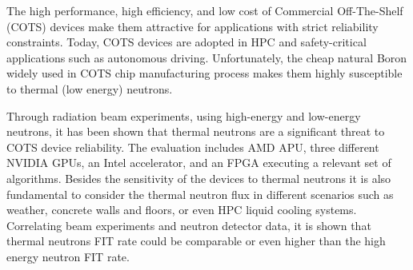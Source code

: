 The high performance, high efficiency, and low cost of Commercial Off-The-Shelf (COTS) devices make them attractive for applications with strict reliability constraints. Today, COTS devices are adopted in HPC and safety-critical applications such as autonomous driving. Unfortunately, the cheap natural Boron widely used in COTS chip manufacturing process makes them highly susceptible to thermal (low energy) neutrons.
 
Through radiation beam experiments, using high-energy and low-energy neutrons, it has been shown that thermal neutrons are a significant threat to COTS device reliability. The evaluation includes AMD APU, three different NVIDIA GPUs, an Intel accelerator, and an FPGA executing a relevant set of algorithms. Besides the sensitivity of the devices to thermal neutrons it is also fundamental to consider the thermal neutron flux in different scenarios such as weather, concrete walls and floors, or even HPC liquid cooling systems. Correlating beam experiments and neutron detector data, it is shown that thermal neutrons 
FIT rate could be comparable or even higher than the high energy neutron FIT rate.

